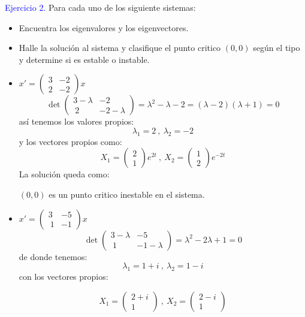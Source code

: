 \textcolor{blue}{Ejercicio 2.}
Para cada uno de los siguiente sistemas:
\begin{itemize}
    \item Encuentra los eigenvalores y los eigenvectores.
    \item Halle la soluci\'on al sistema  y clasifique el punto critico $(0,0)$ seg\'un el tipo y determine si es estable o instable.

\end{itemize}

\begin{itemize}
    \item $ x'=\begin{pmatrix}3&-2\\ 2&-2\end{pmatrix}x $
            $$\det \begin{pmatrix}3-\lambda&-2\\ \:2&-2-\lambda\end{pmatrix}=\lambda^2-\lambda-2=\left(\lambda -2\right)\left(\lambda +1\right)=0$$
            as\'i tenemos los valores propios:
            $$\lambda_1=2\:,\: \lambda_2=-2$$
            y los vectores propios como:
            $$X_1=\begin{pmatrix}2\\ 1\end{pmatrix}e^{2t}\:,\: X_2=\begin{pmatrix}1\\ 2\end{pmatrix}e^{-2t}$$
            La soluci\'on queda como:
            
            
            
            $(0,0)$ es un punto critico inestable en el sistema.
    \item $x'=\begin{pmatrix}3&-5\\ \:1&-1\end{pmatrix}x$
        $$\det \begin{pmatrix}3-\lambda&-5\\ \:1&-1-\lambda\end{pmatrix}=\lambda^2-2\lambda+1=0$$
        de donde tenemos:
        $$\lambda_1=1+i\:,\: \lambda_2=1-i$$
        con los vectores propios:
        
        $$X_1=\begin{pmatrix}2+i\\ 1\end{pmatrix}\:,\:X_2=\begin{pmatrix}2-i\\ 1\end{pmatrix}$$
        

\end{itemize}
